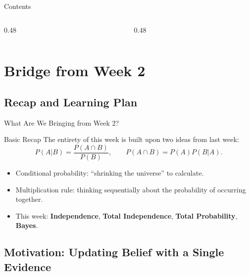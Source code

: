 \documentclass[light]{lutbeamer}
\begin{document}
\begin{frame}{Contents}
  \scriptsize
  \begin{columns}[T]
    \begin{column}{0.48\textwidth}
      \tableofcontents[sections={1-4}]
    \end{column}
    \begin{column}{0.48\textwidth}
      \tableofcontents[sections={5-10}]
    \end{column}
  \end{columns}
\end{frame}



\section{Bridge from Week 2}
\subsection{Recap and Learning Plan}

\begin{frame}{What Are We Bringing from Week 2?}
    \begin{block}{Basic Recap}
        The entirety of this week is built upon two ideas from last week:
        \[
        P(A|B)=\frac{P(A\cap B)}{P(B)}, \qquad
        P(A\cap B)=P(A)P(B|A).
        \]
    \end{block}

    \begin{itemize}
        \item Conditional probability: ``shrinking the universe'' to calculate.
        \item Multiplication rule: thinking sequentially about the probability of occurring together.
        \item This week: \textbf{Independence}, \textbf{Total Independence}, \textbf{Total Probability}, \textbf{Bayes}.
    \end{itemize}
\end{frame}

\subsection{Motivation: Updating Belief with a Single Evidence}
\end{document}

